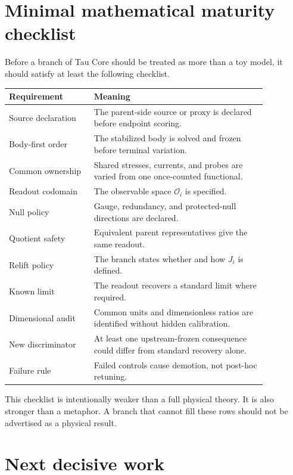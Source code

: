 \documentclass[11pt]{article}
\newcommand{\Obs}{\mathcal O}
\begin{document}
\section{Minimal mathematical maturity checklist}

Before a branch of Tau Core should be treated as more than a toy model, it
should satisfy at least the following checklist.

\begin{center}
\begin{tabular}{p{0.28\linewidth}p{0.58\linewidth}}
\toprule
Requirement & Meaning\\
\midrule
Source declaration & The parent-side source or proxy is declared before endpoint scoring.\\
Body-first order & The stabilized body is solved and frozen before terminal variation.\\
Common ownership & Shared stresses, currents, and probes are varied from one once-counted functional.\\
Readout codomain & The observable space \(\Obs_i\) is specified.\\
Null policy & Gauge, redundancy, and protected-null directions are declared.\\
Quotient safety & Equivalent parent representatives give the same readout.\\
Relift policy & The branch states whether and how \(J_i\) is defined.\\
Known limit & The readout recovers a standard limit where required.\\
Dimensional audit & Common units and dimensionless ratios are identified without hidden calibration.\\
New discriminator & At least one upstream-frozen consequence could differ from standard recovery alone.\\
Failure rule & Failed controls cause demotion, not post-hoc retuning.\\
\bottomrule
\end{tabular}
\end{center}

This checklist is intentionally weaker than a full physical theory.  It is
also stronger than a metaphor.  A branch that cannot fill these rows should not
be advertised as a physical result.

\section{Next decisive work}
\end{document}

